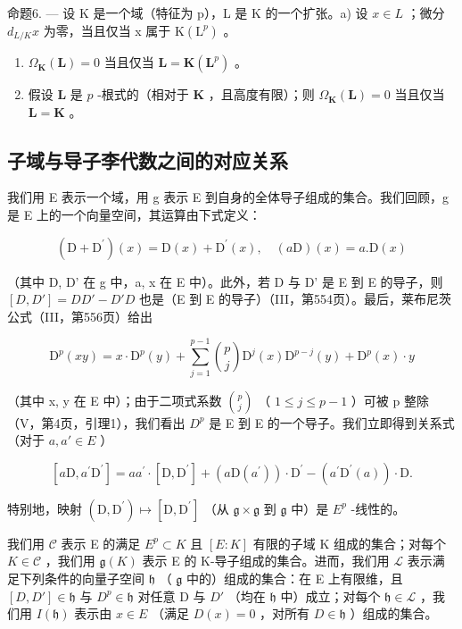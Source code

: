 命题6. --- 设 K 是一个域（特征为 p），L 是 K 的一个扩张。a) 设 \(x \in L\) ；微分 \(d_{L/K}x\) 为零，当且仅当 x 属于 \(\mathrm{K}(\mathrm{L}^{p})\) 。

\begin{enumerate}
\def\labelenumi{\alph{enumi})}
\setcounter{enumi}{1}
\item
  \(\Omega_{\mathbf{K}}(\mathbf{L}) = 0\) 当且仅当 \(\mathbf{L} = \mathbf{K}(\mathbf{L}^p)\) 。
\item
  假设 \(\mathbf{L}\) 是 \(p\) -根式的（相对于 \(\mathbf{K}\) ，且高度有限）；则 \(\Omega_{\mathbf{K}}(\mathbf{L}) = 0\) 当且仅当 \(\mathbf{L} = \mathbf{K}\) 。
\end{enumerate}

\subsection{子域与导子李代数之间的对应关系}

我们用 E 表示一个域，用 g 表示 E 到自身的全体导子组成的集合。我们回顾，g 是 E 上的一个向量空间，其运算由下式定义：

\[
\left(\mathrm{D} + \mathrm{D} ^ {\prime}\right) (x) = \mathrm{D} (x) + \mathrm{D} ^ {\prime} (x), \quad (a \mathrm{D}) (x) = a. \mathrm{D} (x)\tag{6}
\]

（其中 D, D' 在 g 中，a, x 在 E 中）。此外，若 D 与 D' 是 E 到 E 的导子，则 \([D, D'] = DD' - D'D\) 也是（E 到 E 的导子）（III，第554页）。最后，莱布尼茨公式（III，第556页）给出

\[
\mathrm{D} ^ {p} (x y) = x \cdot \mathrm{D} ^ {p} (y) + \sum_ {j = 1} ^ {p - 1} \binom {p} {j} \mathrm{D} ^ {j} (x) \mathrm{D} ^ {p - j} (y) + \mathrm{D} ^ {p} (x) \cdot y
\]

（其中 x, y 在 E 中）；由于二项式系数 \(\binom{p}{j}\) （ \(1 \leqslant j \leqslant p - 1\) ）可被 p 整除（V，第4页，引理1），我们看出 \(D^{p}\) 是 E 到 E 的一个导子。我们立即得到关系式（对于 \(a, a' \in E\) ）

\[
\left[ a \mathrm{D}, a ^ {\prime} \mathrm{D} ^ {\prime} \right] = a a ^ {\prime} \cdot \left[ \mathrm{D}, \mathrm{D} ^ {\prime} \right] + \left(a \mathrm{D} \left(a ^ {\prime}\right)\right) \cdot \mathrm{D} ^ {\prime} - \left(a ^ {\prime} \mathrm{D} ^ {\prime} (a)\right) \cdot \mathrm{D}.\tag{7}
\]

特别地，映射 \((\mathrm{D},\mathrm{D}^{\prime})\mapsto [\mathrm{D},\mathrm{D}^{\prime}]\) （从 \(\mathfrak{g}\times \mathfrak{g}\) 到 \(\mathfrak{g}\) 中）是 \(E^p\) -线性的。

我们用 \(\mathcal{C}\) 表示 E 的满足 \(E^p \subset K\) 且 \([E:K]\) 有限的子域 K 组成的集合；对每个 \(K \in \mathcal{C}\) ，我们用 \(\mathfrak{g}(K)\) 表示 E 的 K-导子组成的集合。进而，我们用 \(\mathcal{L}\) 表示满足下列条件的向量子空间 \(\mathfrak{h}\) （ \(\mathfrak{g}\) 中的）组成的集合：在 E 上有限维，且 \([D,D'] \in \mathfrak{h}\) 与 \(D^p \in \mathfrak{h}\) 对任意 D 与 \(D'\) （均在 \(\mathfrak{h}\) 中）成立；对每个 \(\mathfrak{h} \in \mathcal{L}\) ，我们用 \(I(\mathfrak{h})\) 表示由 \(x \in E\) （满足 \(D(x) = 0\) ，对所有 \(D \in \mathfrak{h}\) ）组成的集合。

